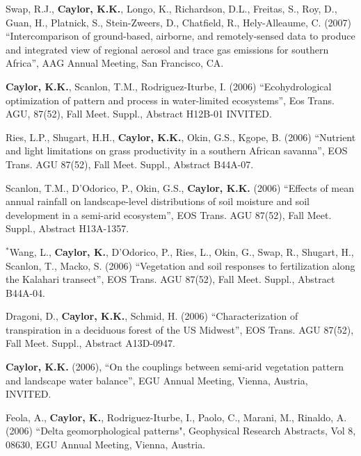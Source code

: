\documentclass[10pt]{article}
\begin{document}
\begin{etaremune}
\item Swap, R.J., \textbf{Caylor, K.K.}, Longo, K., Richardson, D.L., Freitas, S., Roy, D., Guan, H., Platnick,  S., Stein-Zweers, D., Chatfield, R., Hely-Alleaume, C. (2007) ``Intercomparison of ground-based, airborne, and remotely-sensed data to produce and integrated view of regional aerosol and trace gas emissions for southern Africa'', AAG Annual Meeting, San Francisco, CA.

\item \textbf{Caylor, K.K.}, Scanlon, T.M., Rodriguez-Iturbe, I. (2006) ``Ecohydrological optimization of pattern and process in water-limited ecosystems'', Eos Trans. AGU, 87(52), Fall Meet. Suppl., Abstract H12B-01 INVITED.

\item Ries, L.P., Shugart, H.H., \textbf{Caylor, K.K.}, Okin, G.S., Kgope, B. (2006) ``Nutrient and light limitations on grass productivity in a southern African savanna'', EOS Trans. AGU 87(52), Fall Meet. Suppl., Abstract B44A-07.

\item Scanlon, T.M., D'Odorico, P., Okin, G.S., \textbf{Caylor, K.K.} (2006) ``Effects of mean annual rainfall on landscape-level distributions of soil moisture and soil development in a semi-arid ecosystem'', EOS Trans. AGU 87(52), Fall Meet. Suppl., Abstract H13A-1357.

\item $^{*}$Wang, L., \textbf{Caylor, K.}, D'Odorico, P., Ries, L., Okin, G., Swap, R., Shugart, H., Scanlon, T., Macko, S. (2006) ``Vegetation and soil responses to fertilization along the Kalahari transect'', EOS Trans. AGU 87(52), Fall Meet. Suppl., Abstract B44A-04.

\item Dragoni, D., \textbf{Caylor, K.K.}, Schmid, H. (2006) ``Characterization of transpiration in a deciduous forest of the US Midwest'', EOS Trans. AGU 87(52), Fall Meet. Suppl., Abstract A13D-0947.

\item \textbf{Caylor, K.K.} (2006), ``On the couplings between semi-arid vegetation pattern and landscape water balance'', EGU Annual Meeting, Vienna, Austria, INVITED.

\item Feola, A., \textbf{Caylor, K.}, Rodriguez-Iturbe, I., Paolo, C., Marani, M., Rinaldo, A. (2006) ``Delta geomorphological patterns", Geophysical Research Abstracts, Vol 8, 08630, EGU Annual Meeting, Vienna, Austria.


\end{etaremune}
\end{document}
